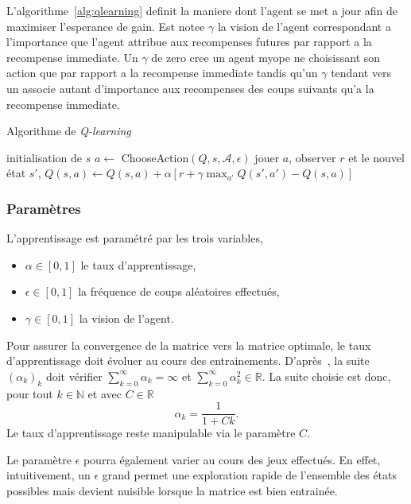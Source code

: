 \documentclass{article}
\newcommand{\R}{\mathbb{R}}
\begin{document}
L'algorithme~\ref{alg:qlearning} definit la maniere dont l'agent se met a jour
afin de maximiser l'esperance de gain. Est notee \(\gamma\) la vision de
l'agent correspondant a l'importance que l'agent attribue aux recompenses
futures par rapport a la recompense immediate. Un \(\gamma\) de zero cree un
agent myope ne choisissant son action que par rapport a la recompense immediate
tandis qu'un \(\gamma\) tendant vers un associe autant d'importance aux
recompenses des coups suivants qu'a la recompense immediate.
\begin{algorithm}
  \caption{Algorithme de \textit{Q-learning}}\label{alg:qlearning}
  \begin{algorithmic}
    [1]
    \Repeat{}
    \State{} initialisation de \(s\)
    \Repeat{}
    \State{} \(a \gets\) ChooseAction$(Q, s, \mathcal{A}, \epsilon)$
    \State{} jouer \(a\), observer \(r\) et le nouvel \'etat \(s'\),
    \State{} \(Q(s, a) \gets Q(s, a) + \alpha\left[ r + \gamma \max_{a'}
      Q(s', a') - Q(s, a)\right]\)
    \EndProcedure{}
  \end{algorithmic}
\end{algorithm}

\subsubsection{Param\`etres}
L'apprentissage est paramétré par les trois variables,
\begin{itemize}
  \item \(\alpha \in [0, 1]\) le taux d'apprentissage,
  \item \(\epsilon \in [0, 1]\) la fréquence de coups aléatoires effectués,
  \item \(\gamma \in [0, 1]\) la vision de l'agent.
\end{itemize}
Pour assurer la convergence de la matrice vers la matrice optimale,
le taux d'apprentissage doit évoluer au cours des entrainements.
D'après~\cite{watkins92}, la suite \( (\alpha_k)_k \) doit vérifier
\( \sum_{k=0}^\infty \alpha_k = \infty \) et \(
\sum_{k=0}^\infty \alpha_k^2 \in \R \). La suite choisie est donc, pour tout
\( k \in \mathbb{N} \) et avec \( C \in \R \)
\[
  \alpha_k = \frac{1}{1 + Ck}.
\]
Le taux d'apprentissage reste manipulable via le paramètre \( C \).


Le paramètre \(\epsilon\) pourra \'egalement varier au cours des jeux effectués.
En effet, intuitivement, un \(\epsilon\) grand permet une exploration rapide de
l'ensemble des états possibles mais devient nuisible lorsque la matrice est bien
entrainée.
\end{document}
